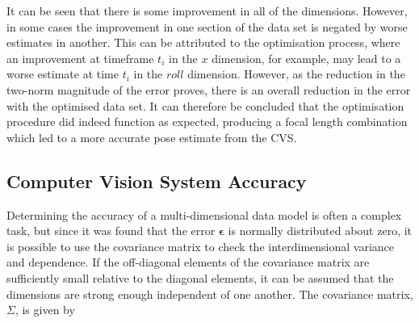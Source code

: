 It can be seen that there is some improvement in all of the dimensions. However, in some cases the improvement in one section of the data set is negated by worse estimates in another. This can be attributed to the optimisation process, where an improvement at timeframe $t_i$ in the $x$ dimension, for example, may lead to a worse estimate at time $t_i$ in the $roll$ dimension. However, as the reduction in the two-norm magnitude of the error proves, there is an overall reduction in the error with the optimised data set. It can therefore be concluded that the optimisation procedure did indeed function as expected, producing a focal length combination which led to a more accurate pose estimate from the CVS. 

\subsection{Computer Vision System Accuracy}

Determining the accuracy of a multi-dimensional data model is often a complex task, but since it was found that the error $\bm{\epsilon}$ is normally distributed about zero, it is possible to use the covariance matrix to check the interdimensional variance and dependence. If the off-diagonal elements of the covariance matrix are sufficiently small relative to the diagonal elements, it can be assumed that the dimensions are strong enough independent of one another. The covariance matrix, $\Sigma$, is given by  

